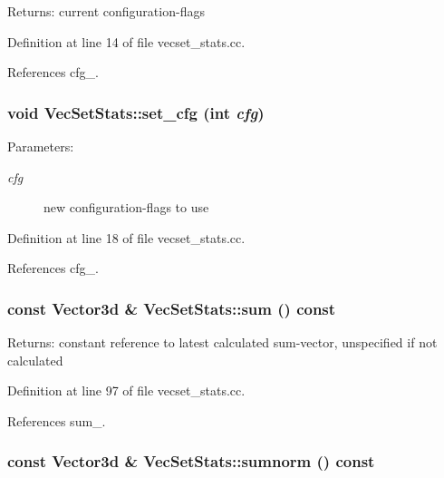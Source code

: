 \begin{Desc}
\item[Returns:]current configuration-flags \end{Desc}


Definition at line 14 of file vecset\_\-stats.cc.

References cfg\_\-.\hypertarget{class_vec_set_stats_41912c77a81f3fbaeaf15dbdcdb4b4b8}{
\subsubsection[set\_\-cfg]{\setlength{\rightskip}{0pt plus 5cm}void VecSetStats::set\_\-cfg (int {\em cfg})}}
\label{class_vec_set_stats_41912c77a81f3fbaeaf15dbdcdb4b4b8}


\begin{Desc}
\item[Parameters:]
\begin{description}
\item[{\em cfg}]new configuration-flags to use \end{description}
\end{Desc}


Definition at line 18 of file vecset\_\-stats.cc.

References cfg\_\-.\hypertarget{class_vec_set_stats_dddc218d55693faa61892774a28b1929}{
\subsubsection[sum]{\setlength{\rightskip}{0pt plus 5cm}const Vector3d \& VecSetStats::sum () const}}
\label{class_vec_set_stats_dddc218d55693faa61892774a28b1929}


\begin{Desc}
\item[Returns:]constant reference to latest calculated sum-vector, unspecified if not calculated \end{Desc}


Definition at line 97 of file vecset\_\-stats.cc.

References sum\_\-.\hypertarget{class_vec_set_stats_cb1197a75e96a53182cc0904312240b3}{
\subsubsection[sumnorm]{\setlength{\rightskip}{0pt plus 5cm}const Vector3d \& VecSetStats::sumnorm () const}}
\label{class_vec_set_stats_cb1197a75e96a53182cc0904312240b3}


